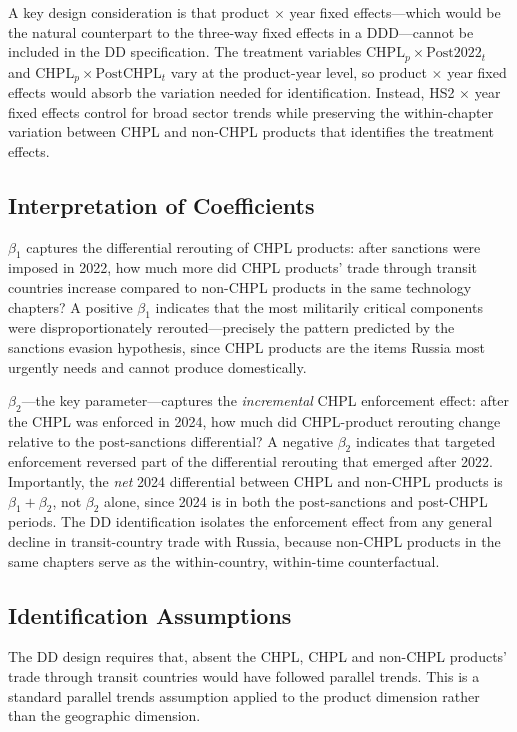 \documentclass[12pt]{article}
\begin{document}
A key design consideration is that product $\times$ year fixed effects---which would be the natural counterpart to the three-way fixed effects in a DDD---cannot be included in the DD specification. The treatment variables $\text{CHPL}_p \times \text{Post2022}_t$ and $\text{CHPL}_p \times \text{PostCHPL}_t$ vary at the product-year level, so product $\times$ year fixed effects would absorb the variation needed for identification. Instead, HS2 $\times$ year fixed effects control for broad sector trends while preserving the within-chapter variation between CHPL and non-CHPL products that identifies the treatment effects.

\subsection{Interpretation of Coefficients}

$\beta_1$ captures the differential rerouting of CHPL products: after sanctions were imposed in 2022, how much more did CHPL products' trade through transit countries increase compared to non-CHPL products in the same technology chapters? A positive $\beta_1$ indicates that the most militarily critical components were disproportionately rerouted---precisely the pattern predicted by the sanctions evasion hypothesis, since CHPL products are the items Russia most urgently needs and cannot produce domestically.

$\beta_2$---the key parameter---captures the \textit{incremental} CHPL enforcement effect: after the CHPL was enforced in 2024, how much did CHPL-product rerouting change relative to the post-sanctions differential? A negative $\beta_2$ indicates that targeted enforcement reversed part of the differential rerouting that emerged after 2022. Importantly, the \textit{net} 2024 differential between CHPL and non-CHPL products is $\beta_1 + \beta_2$, not $\beta_2$ alone, since 2024 is in both the post-sanctions and post-CHPL periods. The DD identification isolates the enforcement effect from any general decline in transit-country trade with Russia, because non-CHPL products in the same chapters serve as the within-country, within-time counterfactual.

\subsection{Identification Assumptions}

The DD design requires that, absent the CHPL, CHPL and non-CHPL products' trade through transit countries would have followed parallel trends. This is a standard parallel trends assumption applied to the product dimension rather than the geographic dimension.
\end{document}
